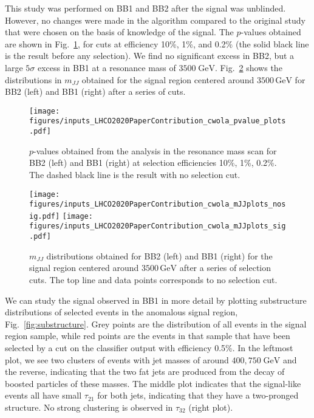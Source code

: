 \documentclass[a4paper,11pt]{article}
\begin{document}
This study was performed on BB1 and BB2 after the signal was unblinded. However, no changes were made in the algorithm compared to the original study~\cite{Collins:2018epr,Collins:2019jip} that were chosen on the basis of knowledge of the signal. The $p$-values obtained are shown in Fig.~\ref{fig:pval}, for cuts at efficiency 10\%, 1\%, and 0.2\% (the solid black line is the result before any selection). We find no significant excess in BB2, but a large $5\sigma$ excess in BB1 at a resonance mass of $3500\;\mathrm{GeV}$. Fig.~\ref{fig:mjj} shows the distributions in $m_{JJ}$ obtained for the signal region centered around $3500\,\mathrm{GeV}$ for BB2 (left) and BB1 (right) after a series of cuts.

\begin{figure}[h!]
    \centering
    \texttt{[image: figures/inputs\_LHCO2020PaperContribution\_cwola\_pvalue\_plots.pdf]}
    \caption{$p$-values obtained from the analysis in the resonance mass scan for BB2 (left) and BB1 (right) at selection efficiencies 10\%, 1\%, 0.2\%. The dashed black line is the result with no selection cut.}
    \label{fig:pval}
\end{figure}

\begin{figure}[h!]
    \centering
    \texttt{[image: figures/inputs\_LHCO2020PaperContribution\_cwola\_mJJplots\_nosig.pdf]}
    \texttt{[image: figures/inputs\_LHCO2020PaperContribution\_cwola\_mJJplots\_sig.pdf]}
    \caption{$m_{JJ}$ distributions obtained for BB2 (left) and BB1 (right) for the signal region centered around $3500\,\mathrm{GeV}$ after a series of selection cuts. The top line and data points corresponds to no selection cut.}
    \label{fig:mjj}
\end{figure}

We can study the signal observed in BB1 in more detail by plotting substructure distributions of selected events in the anomalous signal region, Fig.~\ref{fig:substructure}. Grey points are the distribution of all events in the signal region sample, while red points are the events in that sample that have been selected by a cut on the classifier output with efficiency 0.5\%. In the leftmost plot, we see two clusters of events with jet masses of around $400,750\;\text{GeV}$ and the reverse, indicating that the two fat jets are produced from the decay of boosted particles of these masses. The middle plot indicates that the signal-like events all have small $\tau_{21}$ for both jets, indicating that they have a two-pronged structure. No strong clustering is observed in $\tau_{32}$ (right plot). 
\end{document}
